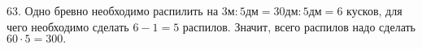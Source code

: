 63. Одно бревно необходимо распилить на $3\text{м}:5\text{дм}=30\text{дм}:5\text{дм}=6$ кусков, для чего необходимо сделать $6-1=5$ распилов. Значит, всего распилов надо сделать $60\cdot5=300.$\\

